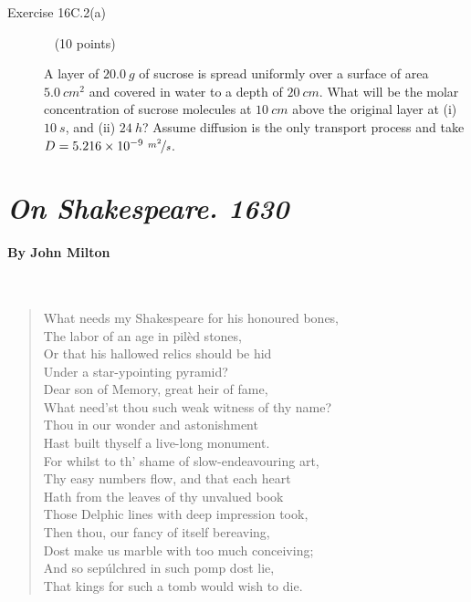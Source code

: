 \documentclass[12pt, openany, letterpaper]{memoir}
\begin{document}
\begin{description}
	      \vspace{23em}
	\item [Exercise 16C.2(a)] ~ (10 points)

	      A layer of $20.0~g$ of sucrose is spread uniformly over a surface of area $5.0~cm^2$ and covered in water to a depth of $20~cm$. What will be the molar concentration of sucrose molecules at $10~cm$ above the original layer at (i) $10~s$, and (ii) $24~h$? Assume diffusion is the only transport process and take $D=5.216\times10^{-9}~\nicefrac{m^2}{s}$.
\end{description}
\newpage
\pagestyle{empty}
\addtocounter{page}{-1}
\section*{\emph{On Shakespeare. 1630}}
\paragraph{By John Milton}~
\begin{verse}
	What needs my Shakespeare for his honoured bones,\\
	The labor of an age in pilèd stones,\\
	Or that his hallowed relics should be hid\\
	Under a star-ypointing pyramid?\\
	Dear son of Memory, great heir of fame,\\
	What need’st thou such weak witness of thy name?\\
	Thou in our wonder and astonishment\\
	Hast built thyself a live-long monument.\\
	For whilst to th’ shame of slow-endeavouring art,\\
	Thy easy numbers flow, and that each heart\\
	Hath from the leaves of thy unvalued book\\
	Those Delphic lines with deep impression took,\\
	Then thou, our fancy of itself bereaving,\\
	Dost make us marble with too much conceiving;\\
	And so sepúlchred in such pomp dost lie,\\
	That kings for such a tomb would wish to die.
\end{verse}
\end{document}

